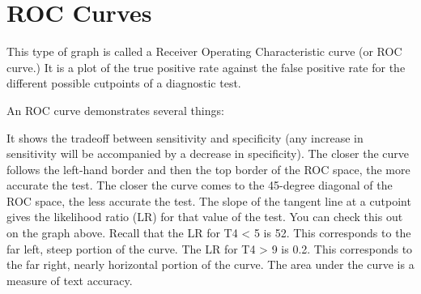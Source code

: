 \documentclass[caret-main.tex]{subfiles}
\begin{document}
\section{ROC Curves}


This type of graph is called a Receiver Operating Characteristic curve (or ROC curve.) It is a plot of the true positive rate against the false positive rate for the different possible cutpoints of a diagnostic test.

An ROC curve demonstrates several things:

It shows the tradeoff between sensitivity and specificity (any increase in sensitivity will be accompanied by a decrease in specificity).
The closer the curve follows the left-hand border and then the top border of the ROC space, the more accurate the test.
The closer the curve comes to the 45-degree diagonal of the ROC space, the less accurate the test.
The slope of the tangent line at a cutpoint gives the likelihood ratio (LR) for that value of the test. You can check this out on the graph above. Recall that the LR for T4 < 5 is 52. This corresponds to the far left, steep portion of the curve. The LR for T4 > 9 is 0.2. This corresponds to the far right, nearly horizontal portion of the curve.
The area under the curve is a measure of text accuracy.

\end{document}
